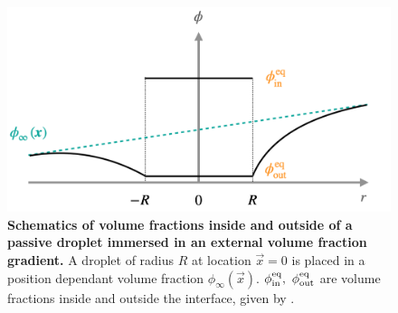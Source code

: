 \begin{figure}[tb]
\centering
\includegraphics[scale=0.4]{MainContent/Figures/drop_in_gradient_schematic.pdf}
\caption{\textbf{Schematics of volume fractions inside and outside of a passive droplet immersed in an external volume fraction gradient.}
A droplet of radius $R$ at location $\vec{x} = 0$ is placed in a position dependant volume fraction $\phi_\infty (\vec{x})$.
$\phi^\mathrm{eq}_\mathrm{in},~\phi^\mathrm{eq}_\mathrm{out}$ are volume fractions inside and outside the interface, given by .
}
\label{fig:drop_in_gradient_schematic}
\end{figure}

